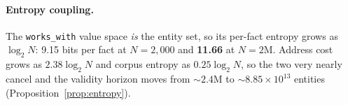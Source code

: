 \paragraph{Entropy coupling.} The \texttt{works\_with} value space \emph{is} the entity set, so its
per-fact entropy grows as $\log_2 N$: 9.15 bits per fact at $N = 2{,}000$ and \textbf{11.66} at
$N = 2$M. Address cost grows as $2.38\log_2 N$ and corpus entropy as $0.25\log_2 N$, so the two very
nearly cancel and the validity horizon moves from ${\sim}2.4$M to ${\sim}8.85\times10^{13}$ entities
(Proposition~\ref{prop:entropy}).
